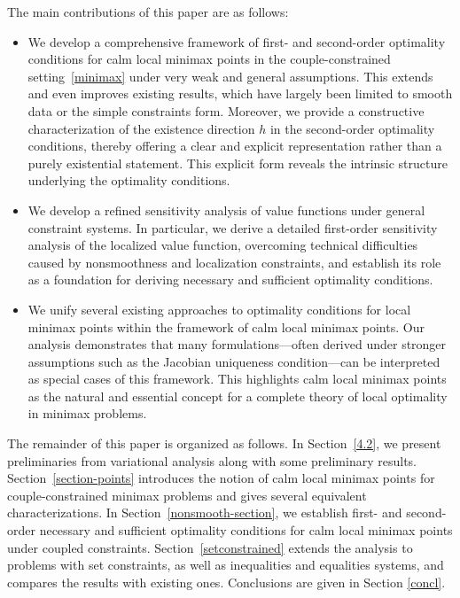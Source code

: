 \documentclass[11pt]{article}
\numberwithin{equation}{section}
\begin{document}
	The main contributions of this paper are as follows:
	\begin{itemize}
		\item We develop a comprehensive framework of first- and second-order optimality conditions for calm local minimax points in the couple-constrained setting~\eqref{minimax} under very weak and general assumptions. This extends and even improves existing results, which have largely been limited to smooth data or the simple constraints form. Moreover, we provide a constructive characterization of the existence direction $h$ in the second-order optimality conditions, thereby offering a clear and explicit representation rather than a purely existential statement. This explicit form reveals the intrinsic structure underlying the optimality conditions.
		
		\item We develop a refined sensitivity analysis of value functions under general constraint systems. In particular, we derive a detailed first-order sensitivity analysis of the localized value function, overcoming technical difficulties caused by nonsmoothness and localization constraints, and establish its role as a foundation for deriving necessary and sufficient optimality conditions.
		
		\item We unify several existing approaches to optimality conditions for local minimax points within the framework of calm local minimax points. Our analysis demonstrates that many formulations—often derived under stronger assumptions such as the Jacobian uniqueness condition—can be interpreted as special cases of this framework. This highlights calm local minimax points as the natural and essential concept for a complete theory of local optimality in minimax problems.
\end{itemize}


The remainder of this paper is organized as follows. In Section~\ref{4.2}, we present preliminaries from variational analysis along with some preliminary results. Section~\ref{section-points} introduces the notion of calm local minimax points for couple-constrained minimax problems and gives several equivalent characterizations. In Section~\ref{nonsmooth-section}, we establish first- and second-order necessary and sufficient optimality conditions for calm local minimax points under coupled constraints. Section~\ref{setconstrained} extends the analysis to problems with set constraints, as well as inequalities and equalities systems, and compares the results with existing ones. Conclusions are given in Section \ref{concl}.
\end{document}
